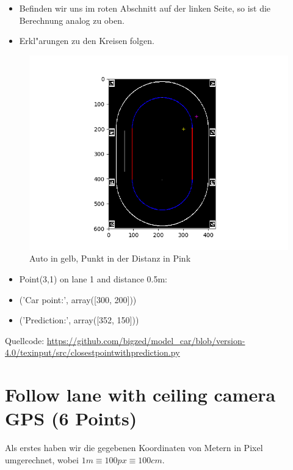 \documentclass[10pt,oneside,a4paper]{article}
\begin{document}
    \begin{itemize}
      \item Befinden wir uns im roten Abschnitt auf der linken Seite, so ist die Berechnung analog zu oben.
    \end{itemize}
        \begin{itemize}
      \item Erkl"arungen zu den Kreisen folgen.
    \end{itemize}
    
    \begin{figure}[h]
      \centering
      \includegraphics[scale=1.0]{pictures/u10_Figure_1.png}
      \caption{Auto in gelb, Punkt in der Distanz in Pink}
    \end{figure}
    \begin{itemize}
      \item Point(3,1) on lane 1 and distance 0.5m:
      \item ('Car point:', array([300, 200]))
      \item ('Prediction:', array([352, 150]))

    \end{itemize}
    
    Quellcode:
    \url{https://github.com/bigzed/model_car/blob/version-4.0/texinput/src/closestpointwithprediction.py}

    
  \section{Follow lane with ceiling camera GPS (6 Points)}
    Als erstes haben wir die gegebenen Koordinaten von Metern in Pixel umgerechnet, wobei \( 1m
    \equiv 100px \equiv 100cm \).
\end{document}
